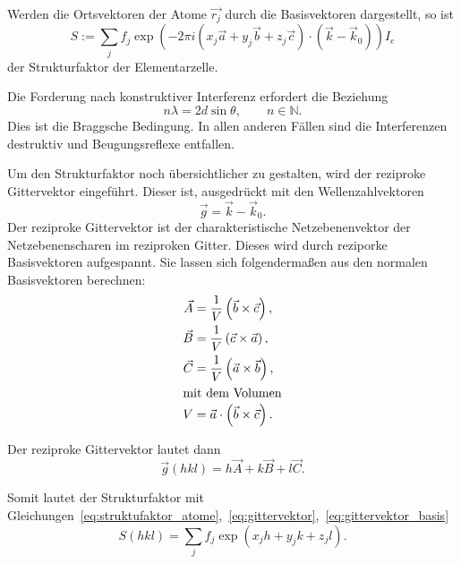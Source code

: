 Werden die Ortsvektoren der Atome $\vec{r_j}$ durch die Basisvektoren dargestellt, so ist
\begin{equation}
  \label{eq:struktufaktor_atome}
  S := \sum_j f_j \exp\left(-2\pi i \left(x_j \vec{a} + y_j \vec{b} + z_j \vec{c}\right) \cdot \left(\vec{k} - \vec{k}_0 \right)\right) I_e
\end{equation}
der Strukturfaktor der Elementarzelle.

Die Forderung nach konstruktiver Interferenz erfordert die Beziehung
\begin{equation}
  \label{eq:bragg}
  n \lambda = 2 d \sin{\theta}, \hspace{2em} n \in \mathbb{N}.
\end{equation}
Dies ist die Braggsche Bedingung.
In allen anderen Fällen sind die Interferenzen destruktiv und Beugungsreflexe entfallen.

Um den Strukturfaktor noch übersichtlicher zu gestalten, wird der reziproke Gittervektor eingeführt.
Dieser ist, ausgedrückt mit den Wellenzahlvektoren
\begin{equation}
  \label{eq:gittervektor}
  \vec{g} = \vec{k} - \vec{k}_0.
\end{equation}
Der reziproke Gittervektor ist der charakteristische Netzebenenvektor der Netzebenenscharen im reziproken Gitter.
Dieses wird durch reziporke Basisvektoren aufgespannt.
Sie lassen sich folgendermaßen aus den normalen Basisvektoren berechnen:
\begin{align}
  \label{eq:reziproke_basisvektoren}
  \vec{A} &= \frac{1}{V} \left(\vec{b} \times \vec{c}\right), \\
  \vec{B} &= \frac{1}{V} \left(\vec{c} \times \vec{a}\right), \\
  \vec{C} &= \frac{1}{V} \left(\vec{a} \times \vec{b}\right), \\
  \intertext{mit dem Volumen}
  V &= \vec{a} \cdot \left(\vec{b} \times \vec{c}\right).
\end{align}

Der reziproke Gittervektor lautet dann
\begin{equation}
  \label{eq:gittervektor_basis}
  \vec{g}(hkl) = h\vec{A} + k\vec{B} + l\vec{C}.
\end{equation}

Somit lautet der Strukturfaktor mit Gleichungen~\eqref{eq:struktufaktor_atome},~\eqref{eq:gittervektor},~\eqref{eq:gittervektor_basis}
\begin{equation}
  S\left(hkl\right) = \sum_j f_j \exp\left(x_j h + y_j k + z_j l\right).
\end{equation}

